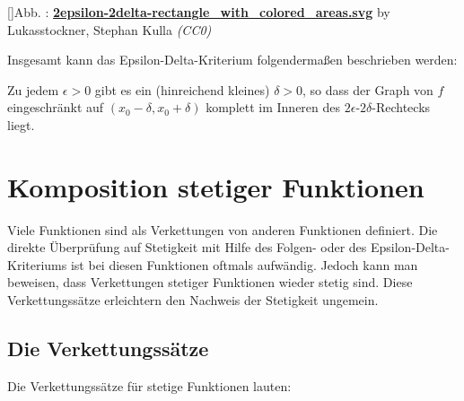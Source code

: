 \documentclass[fontsize=9pt,
               parskip=half-,
               DIV=14,
               listof=chapterentry,
               tocflat]{scrbook}
\newcounter{imagelabel}
\begin{document}
[]{Abb. : \protect\href{https://commons.wikimedia.org/wiki/File:2epsilon-2delta-rectangle_with_colored_areas.svg}{\textbf{2epsilon\allowbreak-2delta\allowbreak-rectangle\allowbreak\_with\allowbreak\_colored\allowbreak\_areas.svg}} by Lukasstockner, Stephan Kulla \textit{(CC0)}}\begin{center}
\end{center}

Insgesamt kann das Epsilon-Delta-Kriterium folgendermaßen beschrieben werden:

\begin{importantparagraph*}
Zu jedem $\epsilon >0$ gibt es ein (hinreichend kleines) $\delta >0$, so dass der Graph von $f$ eingeschränkt auf $(x_{0}-\delta ,x_{0}+\delta )$ komplett im Inneren des $2\epsilon $-$2\delta $-Rechtecks liegt.

\end{importantparagraph*}

\chapter{Komposition stetiger Funktionen}

Viele Funktionen sind als Verkettungen von anderen Funktionen definiert. Die direkte Überprüfung auf Stetigkeit mit Hilfe des Folgen- oder des Epsilon-Delta-Kriteriums ist bei diesen Funktionen oftmals aufwändig. Jedoch kann man beweisen, dass Verkettungen stetiger Funktionen wieder stetig sind. Diese Verkettungssätze erleichtern den Nachweis der Stetigkeit ungemein.

\section{Die Verkettungssätze}

Die Verkettungssätze für stetige Funktionen lauten:
\end{document}
